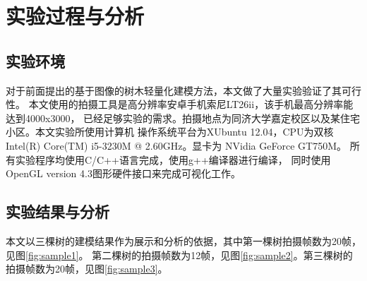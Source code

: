 
\chapter{实验过程与分析}

\section{实验环境}
对于前面提出的基于图像的树木轻量化建模方法，本文做了大量实验验证了其可行性。
本文使用的拍摄工具是高分辨率安卓手机索尼LT26ii，该手机最高分辨率能达到4000x3000，
已经足够实验的需求。拍摄地点为同济大学嘉定校区以及某住宅小区。本文实验所使用计算机
操作系统平台为XUbuntu 12.04，CPU为双核Intel(R) Core(TM) i5-3230M @ 2.60GHz。显卡为
NVidia GeForce GT750M。 所有实验程序均使用C/C++语言完成，使用g++编译器进行编译，
同时使用OpenGL version 4.3图形硬件接口来完成可视化工作。

\section{实验结果与分析}
本文以三棵树的建模结果作为展示和分析的依据，其中第一棵树拍摄帧数为20帧，见图\ref{fig:sample1}。
第二棵树的拍摄帧数为12帧，见图\ref{fig:sample2}。第三棵树的拍摄帧数为20帧，见图\ref{fig:sample3}。

